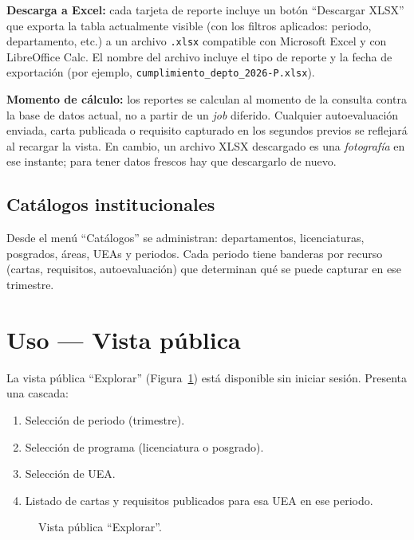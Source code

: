 \documentclass{computacion}
\begin{document}
\textbf{Descarga a Excel:} cada tarjeta de reporte incluye un botón ``Descargar XLSX'' que exporta la tabla actualmente visible (con los filtros aplicados: periodo, departamento, etc.) a un archivo \texttt{.xlsx} compatible con Microsoft Excel y con LibreOffice Calc. El nombre del archivo incluye el tipo de reporte y la fecha de exportación (por ejemplo, \texttt{cumplimiento\_depto\_2026-P.xlsx}).

\textbf{Momento de cálculo:} los reportes se calculan al momento de la consulta contra la base de datos actual, no a partir de un \emph{job} diferido. Cualquier autoevaluación enviada, carta publicada o requisito capturado en los segundos previos se reflejará al recargar la vista. En cambio, un archivo XLSX descargado es una \emph{fotografía} en ese instante; para tener datos frescos hay que descargarlo de nuevo.

\subsection{Catálogos institucionales}
Desde el menú ``Catálogos'' se administran: departamentos, licenciaturas, posgrados, áreas, UEAs y periodos. Cada periodo tiene banderas por recurso (cartas, requisitos, autoevaluación) que determinan qué se puede capturar en ese trimestre.

\section{Uso — Vista pública}

La vista pública ``Explorar'' (Figura~\ref{fig:m-publico}) está disponible sin iniciar sesión. Presenta una cascada:

\begin{enumerate}
    \item Selección de periodo (trimestre).
    \item Selección de programa (licenciatura o posgrado).
    \item Selección de UEA.
    \item Listado de cartas y requisitos publicados para esa UEA en ese periodo.
\end{enumerate}

\begin{figure}[!ht]
    \centering
    \caption{Vista pública ``Explorar''.}
    \label{fig:m-publico}
\end{figure}
\end{document}

